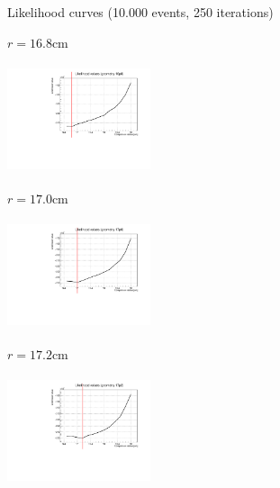 \documentclass[8 pt]{beamer}
\begin{document}
\begin{frame}{Likelihood curves (10.000 events, 250 iterations)}
\justifying
\begin{minipage}[c]{.32\textwidth}
\begin{exampleblock}{} \begin{center}$r = 16.8$cm\end{center} \end{exampleblock}
\includegraphics[width=4.2cm, height=3.2cm]{figs/likelihood250LowStat/likelihood16p8.pdf} 
\end{minipage}
\begin{minipage}[c]{.32\textwidth}
\begin{exampleblock}{} \begin{center}$r = 17.0$cm\end{center} \end{exampleblock}
\includegraphics[width=4.2cm, height=3.2cm]{figs/likelihood250LowStat/likelihood17p0.pdf} 
\end{minipage}
\begin{minipage}[c]{.32\textwidth}
\begin{exampleblock}{} \begin{center}$r = 17.2$cm\end{center} \end{exampleblock}
\includegraphics[width=4.2cm, height=3.2cm]{figs/likelihood250LowStat/likelihood17p2.pdf} 
\end{minipage}


\end{frame}
\end{document}
